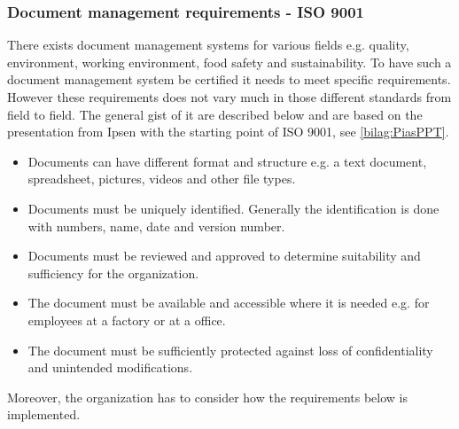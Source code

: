 \subsubsection{Document management requirements - ISO 9001} \label{sec:DMR}
There exists document management systems for various fields e.g. quality, environment, working environment, food safety and sustainability.
To have such a document management system be certified it needs to meet specific requirements.
However these requirements does not vary much in those different standards from field to field.
The general gist of it are described below and are based on the presentation from Ipsen with the starting point of ISO 9001, see \cref{bilag:PiasPPT}.

\begin{itemize}
	\item
	Documents can have different format and structure e.g. a text document, spreadsheet, pictures, videos and other file types.
	\item
	Documents must be uniquely identified.
	Generally the identification is done with numbers, name, date and version number.
	\item
	Documents must be reviewed and approved to determine suitability and sufficiency for the organization.
	\item
	The document must be available and accessible where it is needed e.g. for employees at a factory or at a office.
	\item
	The document must be sufficiently protected against loss of confidentiality and unintended modifications.
\end{itemize}

Moreover, the organization has to consider how the requirements below is implemented.

